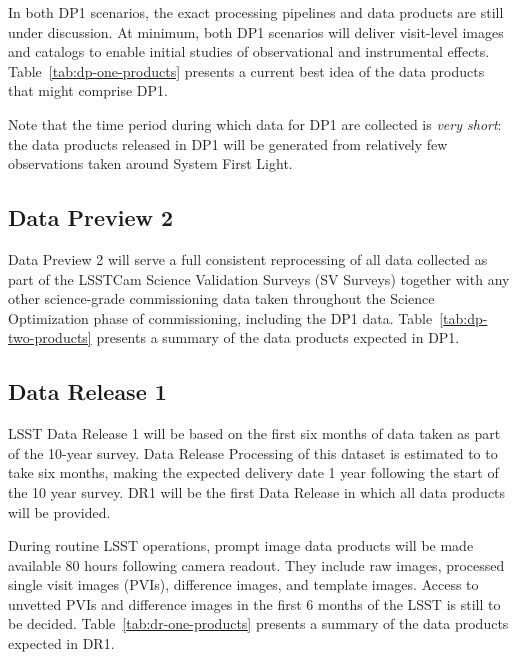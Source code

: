 In both DP1 scenarios, the exact processing pipelines and data products are still under discussion.
At minimum, both DP1 scenarios  will deliver visit-level images and catalogs to enable initial studies of observational and instrumental effects. 
Table~\ref{tab:dp-one-products} presents a current best idea of  the data products that might  comprise DP1. 

Note that the time period during which data for DP1 are collected is \textit{very short}: the data products released in DP1 will be generated from relatively few observations taken around System First Light.

\subsection{Data Preview 2}
\label{sec:dp2}

Data Preview 2 will serve a full consistent reprocessing of all data collected as part of the LSSTCam Science Validation Surveys (SV Surveys) together with any other science-grade commissioning data taken throughout the Science Optimization phase of commissioning, including the DP1 data. 
Table~\ref{tab:dp-two-products} presents a summary of the data products expected in DP1.

\subsection{Data Release 1}
\label{sec:dr1}

LSST Data Release 1 will be based on the first six months of data taken as part of the 10-year survey. 
Data Release Processing of this dataset is estimated to to take six months, making the expected delivery date 1 year following the start of the 10 year survey. 
DR1 will be the first Data Release in which all data products will be provided. 

During routine LSST operations, prompt image data products will be made available 80 hours following camera readout.
They include raw images, processed single visit images (PVIs), difference images, and template images.
Access to unvetted PVIs and difference images in the first 6 months of the LSST is still to be decided.
Table~\ref{tab:dr-one-products} presents a summary of the data products expected in DR1.

